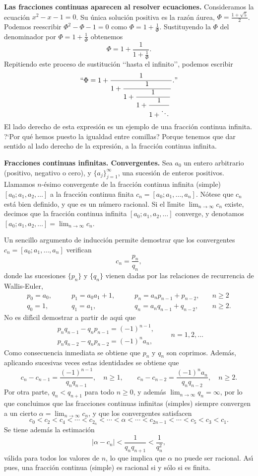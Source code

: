 \noindent\textbf{Las fracciones continuas aparecen al resolver ecuaciones. }
Consideramos la ecuaci\'on $x^2-x-1=0$. Su \'unica soluci\'on positiva es la
raz\'on \'aurea, $\Phi=\frac{1+\sqrt{5}}2$. Podemos reescribir $\Phi^2-\Phi-1=0$
como $\Phi=1+\frac1\Phi$. Sustituyendo la $\Phi$ del denominador por
$\Phi=1+\frac1\Phi$ obtenemos
$$
\Phi=1+\frac1{1+\frac1\Phi}.
$$
Repitiendo este proceso de sustituci\'on \lq\lq hasta el infinito\rq\rq, podemos
escribir
$$
\text{\lq\lq}\Phi=1+\frac1{1+\displaystyle\frac1{1+\displaystyle\frac1{
1+\displaystyle\frac1{1+\ddots}}}}.\text{\rq\rq}
$$
El lado derecho de esta expresi\'on es un ejemplo de una fracci\'on continua
infinita. ?`Por qu\'e hemos puesto la igualdad entre comillas? Porque tenemos
que dar sentido al lado derecho de la expresi\'on, a la fracci\'on continua
infinita. 


\noindent\textbf{Fracciones continuas infinitas. Convergentes. } 
Sea $a_0$ un entero arbitrario (positivo, negativo o cero),  y
$\{a_j\}_{j=1}^\infty$, una sucesi\'on de enteros positivos. 
Llamamos $n$-\'esimo convergente de la fracci\'on continua infinita (simple)
$[a_0;a_1,a_2,\dots]$ a la fracci\'on continua finita $c_n=[a_0;a_1,\dots,a_n]$.
N\'otese que $c_n$ est\'a bien definido, y que es un n\'umero racional. Si el
l\'{\i}mite $\lim_{n\to\infty}c_n$ existe, decimos que la fracci\'on continua
infinita $[a_0;a_1,a_2,\dots]$ converge, y denotamos
$[a_0;a_1,a_2,\dots]=\lim_{n\to\infty}c_n$.




Un sencillo argumento de inducci\'on permite demostrar que los convergentes
$c_n=[a_0;a_1,\dots,a_n]$ verifican
$$
c_n=\frac{p_n}{q_n},
$$
donde las sucesiones $\{p_n\}$ y $\{q_n\}$ vienen dadas por las relaciones de
recurrencia de Wallis-Euler, 
$$
\begin{array}{llll}
p_0=a_0,\qquad& p_1=a_0a_1+1,\qquad &p_n=a_np_{n-1}+p_{n-2},\quad &n\ge 2\\
q_0=1,\qquad& q_1=a_1,\qquad &q_n=a_nq_{n-1}+q_{n-2},\quad &n\ge 2.
\end{array}
$$
No es dif\'{\i}cil demostrar a partir de aqu\'{\i} que
$$
\begin{array}{l}
p_nq_{n-1}-q_np_{n-1}=(-1)^{n-1},\\
p_nq_{n-2}-q_np_{n-2}=(-1)^{n}a_n,
\end{array}
 \qquad n=1,2,\dots
$$
Como consecuencia inmediata se obtiene que $p_n$ y $q_n$ son coprimos. Adem\'as,
aplicando sucesivas veces estas identidades se obtiene que
$$
c_n-c_{n-1}=\frac{(-1)^{n-1}}{q_nq_{n-1}},\quad n\ge 1,\qquad
c_{n}-c_{n-2}=\frac{(-1)^n a_n}{q_nq_{n-2}},\quad n\ge2.
$$
Por otra parte, $q_n<q_{n+1}$ para todo $n\ge0$, y adem\'as
$\lim_{n\to\infty}q_n=\infty$, por lo que concluimos que las fracciones
continuas infinitas (simples) siempre convergen a un cierto
$\alpha=\lim_{n\to\infty}c_n$, y que los convergentes satisfacen
$$
c_0<c_2<c_4<\cdots<c_{2_n}<\cdots<\alpha<\cdots<c_{2n-1}<\cdots<c_5<c_3<c_1.
$$
Se tiene adem\'as la estimaci\'on
$$
\left|\alpha-c_n\right|<\frac1{q_nq_{n+1}}<\frac1{q_{n}^2},
$$
v\'alida para todos los valores de $n$, lo que implica que $\alpha$ no puede ser
racional.
As\'{\i} pues, una fracci\'on continua (simple) es racional si y s\'olo si es
finita.

